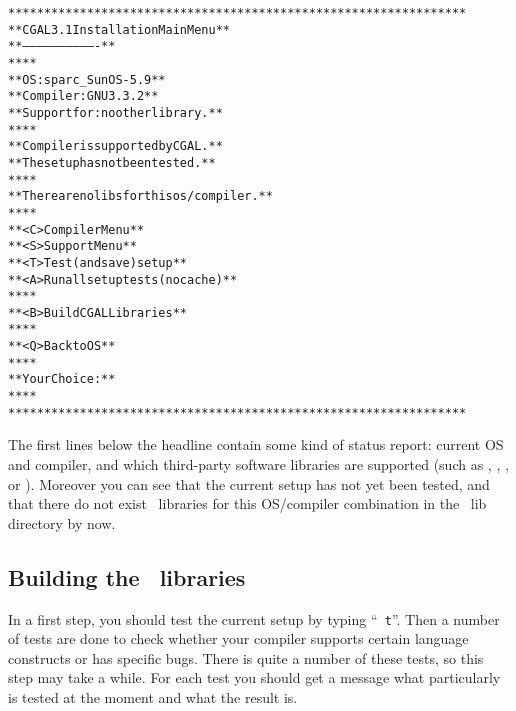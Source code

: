 {\ccTexHtml{\scriptsize}{} \label{pic:main-menu}
\begin{alltt}
  ****************************************************************
  **              CGAL 3.1 Installation Main Menu               **
  **              -------------------------------               **
  **                                                            **
  **   OS:                  sparc_SunOS-5.9                     **
  **   Compiler:            GNU 3.3.2                           **
  **   Support for:         no other library.                   **
  **                                                            **
  **   Compiler is supported by CGAL.                           **
  **   The setup has not been tested.                           **
  **                                                            **
  **   There are no libs for this os/compiler.                  **
  **                                                            **
  **   <C>  Compiler Menu                                       **
  **   <S>  Support Menu                                        **
  **   <T>  Test (and save) setup                               **
  **   <A>  Run all setup tests (no cache)                      **
  **                                                            **
  **   <B>  Build CGAL Libraries                                **
  **                                                            **
  **   <Q>  Back to OS                                          **
  **                                                            **
  **   Your Choice:                                             **
  **                                                            **
  ****************************************************************
\end{alltt}}

The first lines below the headline contain some kind of status report:
current OS and compiler, and which third-party software libraries are
supported (such as \gmp, \core, \leda, or \qt). Moreover you can see
that the current setup has not yet been tested, and that there do not
exist \cgal\ libraries for this OS/compiler combination in the \cgal\ 
lib directory by now.

\subsection{Building the \cgal\ libraries}\label{sec:test-the-setup}

In a first step, you should test the current setup by typing ``{\tt
  t}''. Then a number of tests are done to check whether your compiler
supports certain language constructs or has specific bugs. There is
quite a number of these tests, so this step may take a while. For each
test you should get a message what particularly is tested at the
moment and what the result is.

